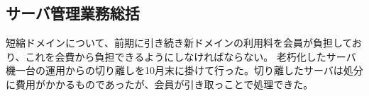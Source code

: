 \subsection*{サーバ管理業務総括}

短縮ドメインについて、前期に引き続き新ドメインの利用料を会員が負担しており、これを会費から負担できるようにしなければならない。
老朽化したサーバ機一台の運用からの切り離しを10月末に掛けて行った。切り離したサーバは処分に費用がかかるものであったが、会員が引き取っことで処理できた。